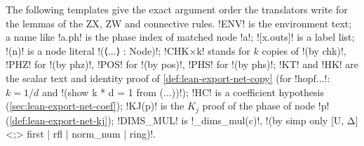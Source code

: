 {The following templates give the exact argument order the translators write for the lemmas of
the ZX, ZW and connective rules. \code!ENV! is the environment text; a name like \code!a.ph! is
the phase index of matched node \code!a!; \code![x.outs]! is a label list; \code!(n)! is a node
literal \code!(⟨...⟩ : Node)!; \code!CHK×k! stands for $k$ copies of \code!(by chk)!, \code!PHZ!
for \code!(by phz)!, \code!POS! for \code!(by pos)!, \code!PHS! for \code!(by phs)!;
\code!KT! and \code!HK! are the scalar text and identity proof of \cref{def:lean-export-net-copy}
(for \code!hopf...!: $k = 1/d$ and \code!(show k * d = 1 from (...))!); \code!HC! is a coefficient
hypothesis (\cref{sec:lean-export-net-coef}); \code!KJ(p)! is the $K_j$ proof of the phase of
node \code!p! (\cref{def:lean-export-net-kj}); \code!DIMS_MUL! is \py!_dims_mul(c)!, \leanx!(by simp only [U, Δ] <;> first | rfl | norm_num | ring)!.

}
